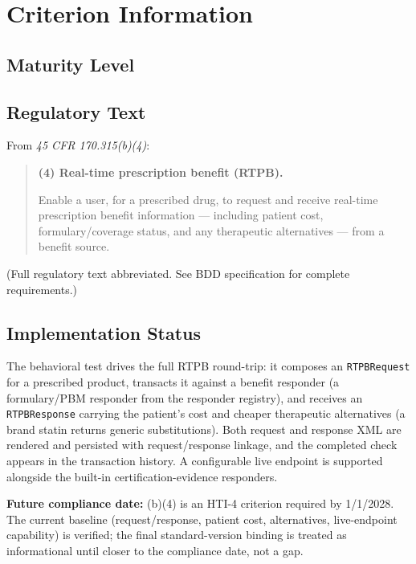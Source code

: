 \section{Criterion Information}

\subsection{Maturity Level}

\subsection{Regulatory Text}

From \textit{45 CFR \textsection{} 170.315(b)(4)}:

\begin{quotation}
\textbf{(4) Real-time prescription benefit (RTPB).}

Enable a user, for a prescribed drug, to request and receive real-time prescription benefit information --- including patient cost, formulary/coverage status, and any therapeutic alternatives --- from a benefit source.
\end{quotation}

(Full regulatory text abbreviated. See BDD specification for complete requirements.)

\subsection{Implementation Status}

The behavioral test drives the full RTPB round-trip: it composes an \texttt{RTPBRequest} for a prescribed product, transacts it against a benefit responder (a formulary/PBM responder from the responder registry), and receives an \texttt{RTPBResponse} carrying the patient's cost and cheaper therapeutic alternatives (a brand statin returns generic substitutions). Both request and response XML are rendered and persisted with request/response linkage, and the completed check appears in the transaction history. A configurable live endpoint is supported alongside the built-in certification-evidence responders.

\textbf{Future compliance date:} (b)(4) is an HTI-4 criterion required by 1/1/2028. The current baseline (request/response, patient cost, alternatives, live-endpoint capability) is verified; the final standard-version binding is treated as informational until closer to the compliance date, not a gap.

